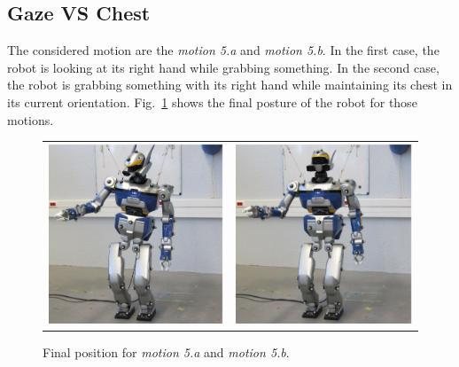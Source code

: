 \documentclass[letterpaper, 10pt, conference]{ieeeconf}      %
\begin{document}
\subsection{Gaze VS Chest}
The considered motion are the \emph{motion 5.a} and \emph{motion 5.b}.
In the first case, the robot is looking at its right hand while grabbing something.
In the second case, the robot is grabbing something with its right hand while
maintaining its chest in its current orientation. Fig.~\ref{fig:motion5}
shows the final posture of the robot for those motions.
\begin{figure}[t]
  \centering
  \begin{tabular}{cc}
    \includegraphics[width=0.45\linewidth]{img/realRobot/5a/5aFinal1.ps} &
    \includegraphics[width=0.45\linewidth]{img/realRobot/5b/5bFinal1.ps} \\
  \end{tabular}
  \caption{Final position for \emph{motion 5.a} and \emph{motion 5.b}.}
  \label{fig:motion5}
\end{figure}
\end{document}
